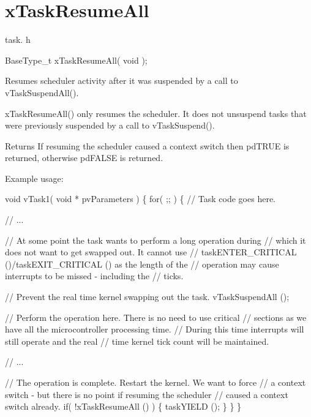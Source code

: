 \hypertarget{group__x_task_resume_all}{}\section{x\+Task\+Resume\+All}
\label{group__x_task_resume_all}
task. h 
\begin{DoxyPre}BaseType\_t xTaskResumeAll( void );\end{DoxyPre}


Resumes scheduler activity after it was suspended by a call to v\+Task\+Suspend\+All().

x\+Task\+Resume\+All() only resumes the scheduler. It does not unsuspend tasks that were previously suspended by a call to v\+Task\+Suspend().

\begin{DoxyReturn}{Returns}
If resuming the scheduler caused a context switch then pd\+T\+R\+UE is returned, otherwise pd\+F\+A\+L\+SE is returned.
\end{DoxyReturn}
Example usage\+: 
\begin{DoxyPre}
void vTask1( void * pvParameters )
\{
    for( ;; )
    \{
     // Task code goes here.\end{DoxyPre}



\begin{DoxyPre}     // ...\end{DoxyPre}



\begin{DoxyPre}     // At some point the task wants to perform a long operation during
     // which it does not want to get swapped out.  It cannot use
     // taskENTER\_CRITICAL ()/taskEXIT\_CRITICAL () as the length of the
     // operation may cause interrupts to be missed - including the
     // ticks.\end{DoxyPre}



\begin{DoxyPre}     // Prevent the real time kernel swapping out the task.
     vTaskSuspendAll ();\end{DoxyPre}



\begin{DoxyPre}     // Perform the operation here.  There is no need to use critical
     // sections as we have all the microcontroller processing time.
     // During this time interrupts will still operate and the real
     // time kernel tick count will be maintained.\end{DoxyPre}



\begin{DoxyPre}     // ...\end{DoxyPre}



\begin{DoxyPre}     // The operation is complete.  Restart the kernel.  We want to force
     // a context switch - but there is no point if resuming the scheduler
     // caused a context switch already.
     if( !xTaskResumeAll () )
     \{
          taskYIELD ();
     \}
    \}
\}
  \end{DoxyPre}
 
